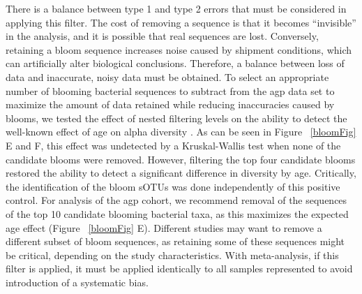 There is a balance between type 1 and type 2 errors that must be considered in applying this filter.
The cost of removing a sequence is that it becomes “invisible” in the analysis, and it is possible
that real sequences are lost. Conversely, retaining a bloom sequence increases noise caused by shipment
conditions, which can artificially alter biological conclusions. Therefore, a balance between loss of data
and inaccurate, noisy data must be obtained. To select an appropriate number of blooming bacterial
sequences to subtract from the \gls{agp} data set to maximize the amount of data retained while
reducing inaccuracies caused by blooms, we tested the effect of nested filtering levels on the ability
to detect the well-known effect of age on alpha diversity \cite{Yatsunenko2012, Koenig2011}.
As can be seen in Figure ~\ref{bloomFig} E and F,
this effect was undetected by a Kruskal-Wallis test when none of the candidate blooms were removed.
However, filtering the top four candidate blooms restored the ability to detect a significant
difference in diversity by age. Critically, the identification of the bloom sOTUs was done
independently of this positive control. For analysis of the \gls{agp} cohort, we recommend
removal of the sequences of the top 10 candidate blooming bacterial taxa, as this maximizes the expected
age effect (Figure ~\ref{bloomFig} E). Different studies may want to remove a different subset of
bloom sequences, as retaining some of these sequences might be critical, depending on the study
characteristics. With meta-analysis, if this filter is applied, it must be applied identically to
all samples represented to avoid introduction of a systematic bias.

